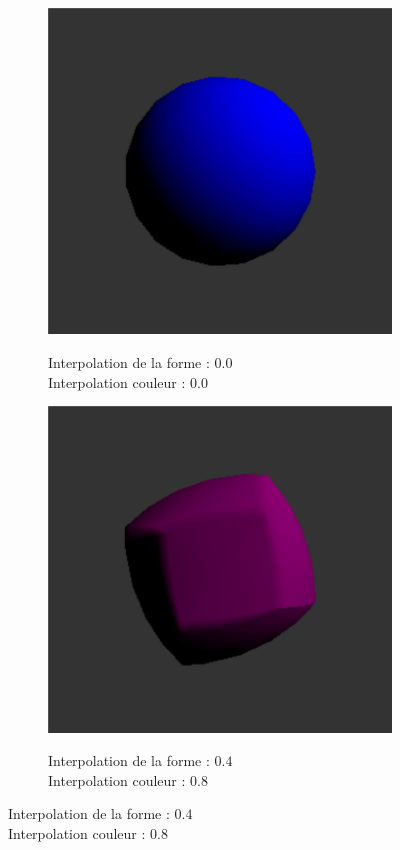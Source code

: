 \begin{figure}
\begin{subfigure}{.5\textwidth}
  \centering
  \caption{Interpolation de la forme : $0.0$ \\ Interpolation couleur : $0.0$}
  \includegraphics[width=1\linewidth]{Graphs/morph1.png}  
  \label{fig:sub-first}
\end{subfigure}
\begin{subfigure}{.5\textwidth}
  \centering
  \caption{Interpolation de la forme : $0.4$ \\ Interpolation couleur : $0.8$}
  \includegraphics[width=1\linewidth]{Graphs/morph2.png}  
  \label{fig:sub-second}
\end{subfigure}


\end{figure}
